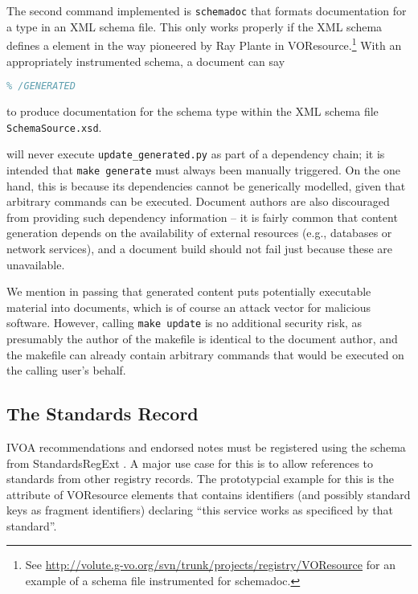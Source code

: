\documentclass[11pt,a4paper]{ivoa}
\begin{document}
The second command implemented is \texttt{schemadoc} that formats
documentation for a type in an XML schema file.  This only works
properly if the XML schema defines a  element in
the way pioneered by Ray Plante in
VOResource.\footnote{See
\url{http://volute.g-vo.org/svn/trunk/projects/registry/VOResource} for
an example of a schema file instrumented for schemadoc.}
With an appropriately instrumented schema, a document can say

\begin{lstlisting}[language=TeX]
% GENERATED: !schemadoc SchemaSource.xsd MyType
% /GENERATED
\end{lstlisting}

to produce documentation for the schema type  within
the XML schema file \texttt{SchemaSource.xsd}.

\ivoatex will never execute \texttt{update\_generated.py} as part of a
dependency chain; it is intended that \texttt{make generate} must always
been manually triggered.  On the one hand, this is because its
dependencies cannot be generically modelled, given that arbitrary
commands can be executed.  Document authors are also discouraged from
providing such dependency information -- it is fairly common that
content generation depends on the availability of external resources
(e.g., databases or network services), and a document build should not
fail just because these are unavailable.

We mention in passing that generated content puts potentially executable
material into documents, which is of course an attack vector for
malicious software.  However, calling \texttt{make update} is no
additional security risk, as presumably the author of the makefile is
identical to the document author, and the makefile can already contain
arbitrary commands that would be executed on the calling user's behalf.

\subsection{The Standards Record}

IVOA recommendations and endorsed notes must be registered using the
schema from StandardsRegExt \citep{2012ivoa.spec.0508H}.  A major use
case for this is to allow references to standards from other registry
records. The prototypcial example for this is the 
attribute of VOResource  elements that contains
identifiers (and possibly standard keys as fragment identifiers)
declaring ``this service works as specificed by that standard''.
\end{document}

